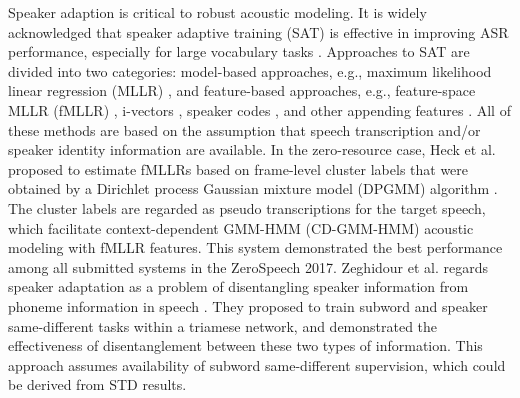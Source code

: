 \documentclass[a4paper]{article}
\begin{document}
Speaker adaption is critical to robust acoustic modeling. It is widely acknowledged that speaker adaptive training (SAT) is effective in improving ASR performance, especially for large vocabulary tasks \cite{anastasakos1997speaker,miao2015speaker,Cui2017}. Approaches to SAT are divided into two  categories: model-based approaches, e.g., maximum likelihood linear regression (MLLR) \cite{gales1998maximum}, and feature-based approaches, e.g., feature-space MLLR (fMLLR) \cite{li2010comparison}, i-vectors \cite{saon2013speaker}, speaker codes \cite{xue2014fast}, and other appending features \cite{Xie2017}.
All of these methods are based on the assumption that speech transcription and/or speaker identity information are available. In the zero-resource case, Heck et al. proposed to estimate fMLLRs based on frame-level cluster labels that were obtained by a Dirichlet process Gaussian mixture model (DPGMM) algorithm \cite{heck2017feature}. The cluster labels are regarded as pseudo transcriptions for the target speech, which facilitate context-dependent GMM-HMM (CD-GMM-HMM) acoustic modeling with fMLLR features. This system demonstrated the best performance among all submitted systems in the ZeroSpeech 2017. 
Zeghidour et al. regards speaker adaptation as a problem of disentangling speaker information from phoneme information in speech \cite{Zeghidour+2016}. They proposed to train subword and speaker same-different tasks within a triamese network, and demonstrated the effectiveness of disentanglement between  these two types of information. This approach assumes availability of subword same-different supervision, which could be derived from STD results.
\end{document}
